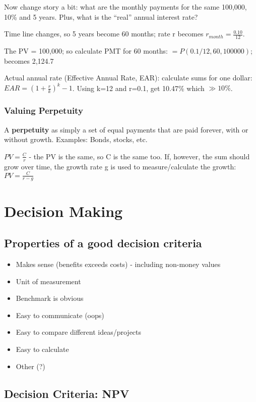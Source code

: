 \documentclass{scrartcl}
\begin{document}
Now change story a bit: what are the monthly payments for the same 100,000, 10\%
and 5 years. Plus, what is the ``real'' annual interest rate?

Time line changes, so 5 years become 60 months; rate r becomes $r_{month} =
\frac{0.10}{12}$.

The PV = 100,000; so calculate PMT for 60 months: $=P(0.1/12, 60, 100000)$;
becomes 2,124.7

Actual annual rate (Effective Annual Rate, EAR): calculate sums for one dollar:
$EAR=\left(1 + \frac{r}{k}\right)^k - 1$. Using k=12 and r=0.1, get 10.47\%
which $\gg 10\%$.

\subsubsection{Valuing Perpetuity}
\label{sec:3-9}

A {\bf perpetuity} as simply a set of equal payments that are paid forever, with
or without growth. Examples: Bonds, stocks, etc.

$PV = \frac{C}{r}$ - the PV is the same, so C is the same too. If, however, the
sum should grow over time, the growth rate g is used to measure/calculate the
growth: $PV = \frac{C}{r-g}$

\section{Decision Making}
\label{sec:4}

\subsection{Properties of a good decision criteria}
\label{sec:4-2}

\begin{itemize}
\item Makes sense (benefits exceeds costs) - including non-money values
\item Unit of measurement
\item Benchmark is obvious
\item Easy to communicate (oops)
\item Easy to compare different ideas/projects
\item Easy to calculate
\item Other (?)
\end{itemize}


\subsection{Decision Criteria: NPV}
\label{sec:4-2-1}
\end{document}
